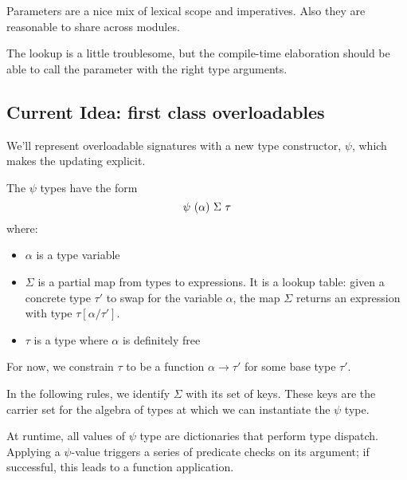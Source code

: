 \documentclass{article}
\begin{document}
Parameters are a nice mix of lexical scope and imperatives.
Also they are reasonable to share across modules.

The lookup is a little troublesome, but the compile-time elaboration should be able to call the parameter with the right type arguments.


\newpage
\subsection*{Current Idea: first class overloadables}
We'll represent overloadable signatures with a new type constructor, $\psi$, which makes the updating explicit.

The $\psi$ types have the form
$$\psi~(\alpha)~\Sigma~\tau$$
where:
\begin{itemize}
\item $\alpha$ is a type variable
\item $\Sigma$ is a partial map from types to expressions.
  It is a lookup table: given a concrete type $\tau'$ to swap for the variable $\alpha$, the map $\Sigma$ returns an expression with type $\tau[\alpha/\tau']$.
\item $\tau$ is a type where $\alpha$ is definitely free
\end{itemize}

For now, we constrain $\tau$ to be a function $\alpha \rightarrow \tau'$ for some base type $\tau'$.

In the following rules, we identify $\Sigma$ with its set of keys.
These keys are the carrier set for the algebra of types at which we can instantiate the $\psi$ type.

At runtime, all values of $\psi$ type are dictionaries that perform type dispatch.
Applying a $\psi$-value triggers a series of predicate checks on its argument; if successful, this leads to a function application.
\end{document}
